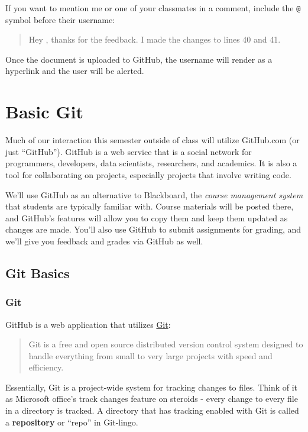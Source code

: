 \documentclass[]{book}
\theoremstyle{definition}
\theoremstyle{definition}
\theoremstyle{definition}
\theoremstyle{remark}
\begin{document}
If you want to mention me or one of your classmates in a comment,
include the \texttt{@} symbol before their username:

\begin{quote}
Hey \citet{chris-prener}, thanks for the feedback. I made the changes to
lines 40 and 41.
\end{quote}

Once the document is uploaded to GitHub, the username will render as a
hyperlink and the user will be alerted.

\hypertarget{basic-git}{\chapter{Basic Git}\label{basic-git}}

Much of our interaction this semester outside of class will utilize
GitHub.com (or just ``GitHub''). GitHub is a web service that is a
social network for programmers, developers, data scientists,
researchers, and academics. It is also a tool for collaborating on
projects, especially projects that involve writing code.

We'll use GitHub as an alternative to Blackboard, the \emph{course
management system} that students are typically familiar with. Course
materials will be posted there, and GitHub's features will allow you to
copy them and keep them updated as changes are made. You'll also use
GitHub to submit assignments for grading, and we'll give you feedback
and grades via GitHub as well.

\section{Git Basics}\label{git-basics}

\subsection{Git}\label{git}

GitHub is a web application that utilizes
\href{https://git-scm.com}{Git}:

\begin{quote}
Git is a free and open source distributed version control system
designed to handle everything from small to very large projects with
speed and efficiency.
\end{quote}

Essentially, Git is a project-wide system for tracking changes to files.
Think of it as Microsoft office's track changes feature on steroids -
every change to every file in a directory is tracked. A directory that
has tracking enabled with Git is called a \textbf{repository} or
``repo'' in Git-lingo.
\end{document}
